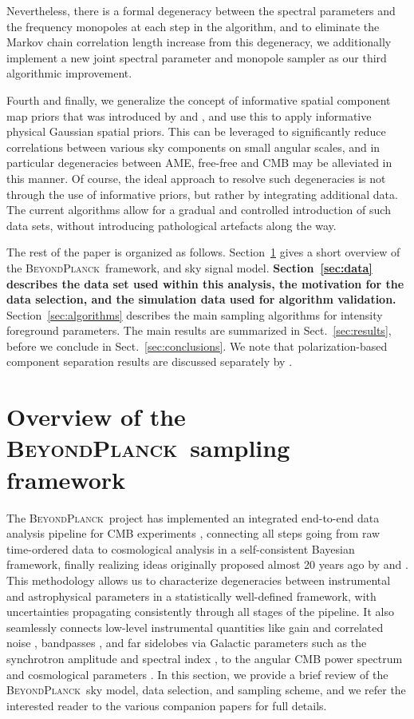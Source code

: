 \documentclass[twocolumn]{aa}
\newcommand{\BP}{\textsc{BeyondPlanck}}
\begin{document}
Nevertheless, there is a formal degeneracy between the spectral
parameters and the frequency monopoles at each step in the algorithm,
and to eliminate the Markov chain correlation length increase from
this degeneracy, we additionally implement a new joint spectral
parameter and monopole sampler as our third algorithmic improvement.

Fourth and finally, we generalize the concept of informative spatial
component map priors that was introduced by
\citet{planck2016-l04} and \citet{npipe}, and use this to apply informative
physical Gaussian spatial priors. This can be leveraged to significantly
reduce correlations between various sky components on small angular
scales, and in particular degeneracies between AME, free-free and CMB
\citep{bp11} may be alleviated in this manner. Of course, the ideal
approach to resolve such degeneracies is not through the use of informative
priors, but rather by integrating additional data. The
current algorithms allow for a gradual and controlled introduction of
such data sets, without introducing pathological artefacts along the
way. 

The rest of the paper is organized as follows.  Section~\ref{sec:bp}
gives a short overview of the \BP\ framework, and sky
signal model. \textbf{Section~\ref{sec:data} 
describes the data set used within this analysis, the motivation for 
the data selection, and the simulation data used for algorithm validation.} Section~\ref{sec:algorithms} describes the main
sampling algorithms for intensity foreground parameters. The main
results are summarized in Sect.~\ref{sec:results}, before we conclude
in Sect.~\ref{sec:conclusions}. We note that polarization-based
component separation results are discussed separately by \citet{bp14}.

\section{Overview of the \BP\ sampling framework}
\label{sec:bp}
The \BP\ project has implemented an
integrated end-to-end data analysis pipeline for CMB experiments \citep{bp01},
connecting all steps going from raw time-ordered data to cosmological
analysis in a self-consistent Bayesian framework, finally realizing ideas originally proposed almost 20 years ago by \citet{jewell2004} and \citet{wandelt2004}. This methodology allows us to
characterize degeneracies between instrumental and astrophysical
parameters in a statistically well-defined framework, with
uncertainties propagating consistently through all stages of the
pipeline. It also seamlessly connects low-level instrumental quantities
like gain \citep{bp07} and correlated noise \citep{bp06}, bandpasses
\citep{bp09}, and far sidelobes \citep{bp08} via Galactic parameters
such as the synchrotron amplitude and spectral index \citep[current
  paper and][]{bp14}, to the angular CMB power spectrum and
cosmological parameters \citep{bp11,bp12}. In this section, we provide
a brief review of the \BP\ sky model, data selection, and sampling
scheme, and we refer the interested reader to the various companion
papers for full details.
\end{document}
